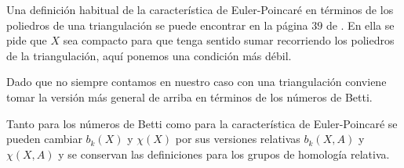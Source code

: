 \begin{nota}
    Una definición habitual de la característica de Euler-Poincaré en términos de los poliedros de una triangulación se puede encontrar en la página $39$ de \cite{munoz2021}. En ella se pide que $X$ sea compacto para que tenga sentido sumar recorriendo los poliedros de la triangulación, aquí ponemos una condición más débil. 
    
    Dado que no siempre contamos en nuestro caso con una triangulación conviene tomar la versión más general de arriba en términos de los números de Betti.
\end{nota}

Tanto para los números de Betti como para la característica de Euler-Poincaré se pueden cambiar $b_k(X)$ y $\chi(X)$ por sus versiones relativas $b_k(X,A)$ y $\chi(X,A)$ y se conservan las definiciones para los grupos de homología relativa.

\bigskip